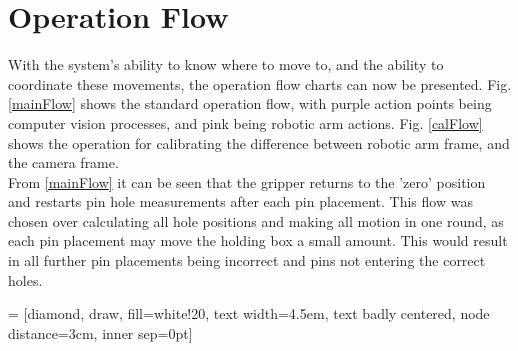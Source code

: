 \documentclass[11pt,a4paper, margin=1in]{report}
\begin{document}
\chapter{Operation Flow}
With the system's ability to know where to move to, and the ability to coordinate these movements, the operation flow charts can now be presented. Fig. \ref{mainFlow} shows the standard operation flow, with purple action points being computer vision processes, and pink being robotic arm actions. Fig. \ref{calFlow} shows the operation for calibrating the difference between robotic arm frame, and the camera frame.\\
From \cref{mainFlow} it can be seen that the gripper returns to the 'zero' position and restarts pin hole measurements after each pin placement. This flow was chosen over calculating all hole positions and making all motion in one round, as each pin placement may move the holding box a small amount. This would result in all further pin placements being incorrect and pins not entering the correct holes. 
 
 = [diamond, draw, fill=white!20, 
text width=4.5em, text badly centered, node distance=3cm, inner sep=0pt]
\end{document}
